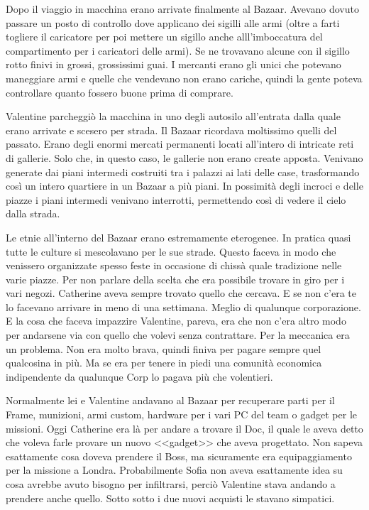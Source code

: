     Dopo il viaggio in macchina erano arrivate finalmente al Bazaar. Avevano dovuto passare un posto di controllo dove
    applicano dei sigilli alle armi (oltre a farti togliere il caricatore per poi mettere un sigillo anche
    alll'imboccatura del compartimento per i caricatori delle armi). Se ne trovavano alcune con il sigillo rotto finivi in grossi, grossissimi guai. I
    mercanti erano gli unici che potevano maneggiare armi e quelle che vendevano non erano cariche, quindi la gente
    poteva controllare quanto fossero buone prima di comprare. 

    Valentine parcheggiò la macchina in uno degli autosilo all'entrata dalla quale erano arrivate e scesero per strada.
    Il Bazaar ricordava moltissimo quelli del passato. Erano degli enormi mercati permanenti locati all'intero di
    intricate reti di gallerie. Solo che, in questo caso, le gallerie non erano create apposta. Venivano generate dai
    piani intermedi costruiti tra i palazzi ai lati delle case, trasformando così un intero quartiere in un Bazaar a più
    piani. In possimità degli incroci e delle piazze i piani intermedi venivano interrotti, permettendo così di vedere
    il cielo dalla strada.

    Le etnie all'interno del Bazaar erano estremamente eterogenee. In pratica quasi tutte le culture si mescolavano per
    le sue strade. Questo faceva in modo che venissero organizzate spesso feste in occasione di chissà quale tradizione
    nelle varie piazze. Per non parlare della scelta che era possibile trovare in giro per i vari negozi. Catherine
    aveva sempre trovato quello che cercava. E se non c'era te lo facevano arrivare in meno di una settimana. Meglio di
    qualunque corporazione. E la cosa che faceva impazzire Valentine, pareva, era che non c'era altro modo per andarsene
    via con quello che volevi senza contrattare. Per la meccanica era un problema. Non era molto brava, quindi finiva
    per pagare sempre quel qualcosina in più. Ma se era per tenere in piedi una comunità economica indipendente da
    qualunque Corp lo pagava più che volentieri.

    Normalmente lei e Valentine andavano al Bazaar per recuperare parti per il Frame, munizioni, armi custom,
    hardware per i vari PC del team o gadget per le missioni. Oggi Catherine era là per andare a trovare il Doc, il
    quale le aveva detto che voleva farle provare un nuovo <<gadget>> che aveva progettato. Non sapeva esattamente cosa
    doveva prendere il Boss, ma sicuramente era equipaggiamento per la missione a Londra. Probabilmente Sofia non aveva
    esattamente idea su cosa avrebbe avuto bisogno per infiltrarsi, perciò Valentine stava andando a prendere anche
    quello. Sotto sotto i due nuovi acquisti le stavano simpatici.

